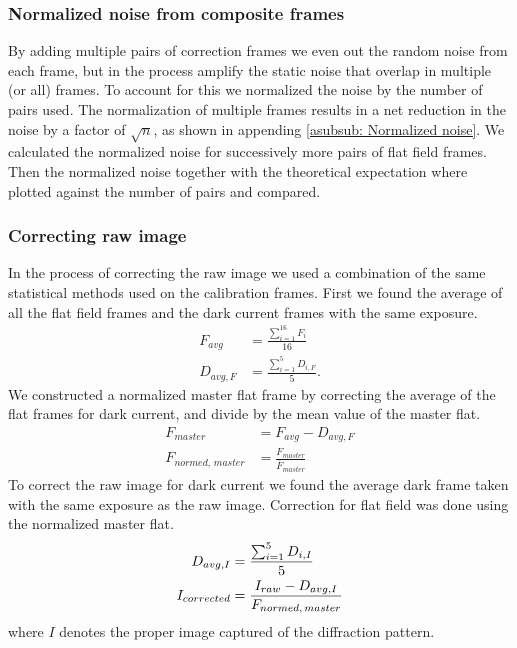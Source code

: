 \documentclass{emulateapj}
\begin{document}
\subsubsection{Normalized noise from composite frames}
\label{subsubsec: Method/Normalized noise}
By adding multiple pairs of correction frames we even out the random noise from each frame, but in the process amplify the static noise that overlap in multiple (or all) frames. To account for this we normalized the noise by the number of pairs used. The normalization of multiple frames results in a net reduction in the noise by a factor of $\sqrt{n}$, as shown in appending \ref{asubsub: Normalized noise}. We calculated the normalized noise for successively more pairs of flat field frames. Then the normalized noise together with the theoretical expectation where plotted against the number of pairs and compared. 

\subsubsection{Correcting raw image}
In the process of correcting the raw image we used a combination of the same statistical methods used on the calibration frames. First we found the average of all the flat field frames and the dark current frames with the same exposure.
\begin{align*}
	F_{avg} &= \frac{\sum_{i=1}^16 F_i}{16} 
	\\
	D_{avg,F} &= \frac{\sum_{i=1}^5 D_{i,F}}{5}.
\end{align*}
We constructed a normalized master flat frame by correcting the average of the flat frames for dark current, and divide by the mean value of the master flat.
\begin{align*}
	F_{master} &= F_{avg} - D_{avg,F}
	\\
	F_{normed,\, master} &=  \frac{F_{master}}{\overline{F}_{master}}
\end{align*}
To correct the raw image for dark current we found the average dark frame taken with the same exposure as the raw image. Correction for flat field was done using the normalized master flat.
\begin{align}
	D_{avg,I} &= \frac{\sum_{i=1}^5 D_{i,I}}{5}	\notag
	\\
	I_{corrected} &= \frac{I_{raw}-D_{avg,I}}{F_{normed,\, master}} \label{eq: Corrected image}
\end{align}
where $I$ denotes the proper image captured of the diffraction pattern.
\end{document}
